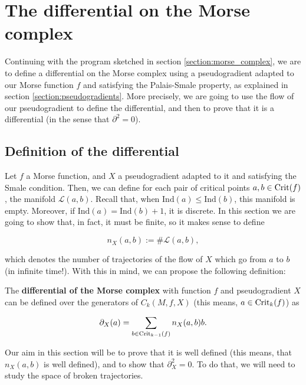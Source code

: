 \section{The differential on the Morse complex} \label{section:morse_differential}

Continuing with the program sketched in section \ref{section:morse_complex}, we are to define a differential on the Morse complex using a pseudogradient adapted to our Morse function $f$ and satisfying the Palais-Smale property, as explained in section \ref{section:pseudogradients}. More precisely, we are going to use the flow of our pseudogradient to define the differential, and then to prove that it is a differential (in the sense that $\partial^2 = 0$).

\subsection{Definition of the differential}

Let $f$ a Morse function, and $X$ a pseudogradient adapted to it and satisfying the Smale condition. Then, we can define for each pair of critical points $a, b \in \text{Crit}(f)$, the manifold $\mathcal{L}(a,b)$. Recall that, when $\text{Ind}(a) \leq \text{Ind}(b)$, this manifold is empty. Moreover, if $\text{Ind}(a) = \text{Ind}(b) + 1$, it is discrete. In this section we are going to show that, in fact, it must be finite, so it makes sense to define

$$n_X(a,b) := \# \mathcal{L}(a,b) ,$$

which denotes the number of trajectories of the flow of $X$ which go from $a$ to $b$ (in infinite time!). With this in mind, we can propose the following definition:

\begin{deff}
The {\bf differential of the Morse complex} with function $f$ and pseudogradient $X$ can be defined over the generators of $C_k(M,f,X)$ (this means, $a \in \text{Crit}_k(f)$) as

\begin{displaymath}
\partial_X (a) = \sum_{b \in \text{Crit}_{k-1}(f)} n_X(a,b) b .
\end{displaymath}
\end{deff}

Our aim in this section will be to prove that it is well defined (this means, that $n_X(a,b)$ is well defined), and to show that $\partial_X^2 = 0$. To do that, we will need to study the space of broken trajectories.
